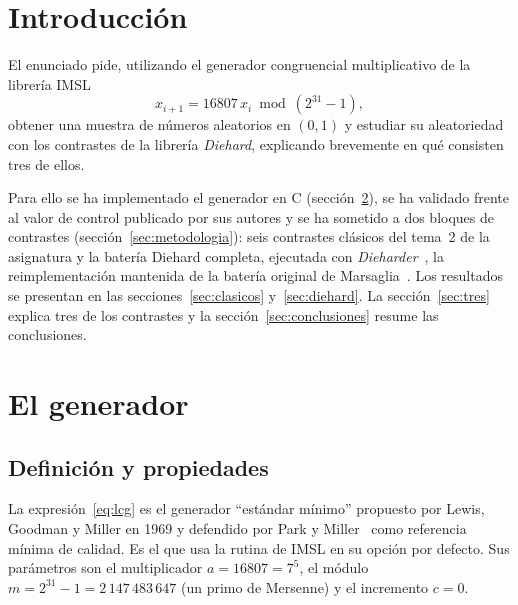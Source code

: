 \documentclass[a4paper,11pt]{article}
\begin{document}
\section{Introducción}

El enunciado pide, utilizando el generador congruencial multiplicativo de la
librería IMSL
\begin{equation}\label{eq:lcg}
  x_{i+1} = 16807\, x_i \bmod (2^{31}-1),
\end{equation}
obtener una muestra de números aleatorios en $(0,1)$ y estudiar su
aleatoriedad con los contrastes de la librería \emph{Diehard}, explicando
brevemente en qué consisten tres de ellos.

Para ello se ha implementado el generador en C (sección~\ref{sec:generador}),
se ha validado frente al valor de control publicado por sus autores y se ha
sometido a dos bloques de contrastes (sección~\ref{sec:metodologia}): seis
contrastes clásicos del tema~2 de la asignatura y la batería Diehard completa,
ejecutada con \emph{Dieharder}~\cite{dieharder}, la reimplementación mantenida de
la batería original de Marsaglia~\cite{diehard}. Los resultados se presentan en
las secciones~\ref{sec:clasicos} y~\ref{sec:diehard}. La
sección~\ref{sec:tres} explica tres de los contrastes y la
sección~\ref{sec:conclusiones} resume las conclusiones.

\section{El generador}\label{sec:generador}

\subsection{Definición y propiedades}

La expresión~\eqref{eq:lcg} es el generador \enquote{estándar mínimo}
propuesto por Lewis, Goodman y Miller en 1969 y defendido por Park y
Miller~\cite{parkmiller} como referencia mínima de calidad. Es el que usa la
rutina  de IMSL en su opción por defecto. Sus parámetros son el
multiplicador $a = 16807 = 7^5$, el módulo $m = 2^{31}-1 = 2\,147\,483\,647$
(un primo de Mersenne) y el incremento $c = 0$.
\end{document}
